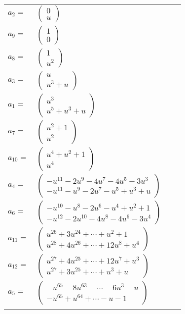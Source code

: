 \documentclass[1p]{elsarticle_modified}
\theoremstyle{definition}
\begin{document}
\begin{tabular}{m{7pt} m{180pt} m{7pt} m{180pt} }
\flushright $a_{2}=$&$\begin{pmatrix}0\\u\end{pmatrix}$ \\
\flushright $a_{9}=$&$\begin{pmatrix}1\\0\end{pmatrix}$ \\
\flushright $a_{8}=$&$\begin{pmatrix}1\\u^2\end{pmatrix}$ \\
\flushright $a_{3}=$&$\begin{pmatrix}u\\u^3+u\end{pmatrix}$ \\
\flushright $a_{1}=$&$\begin{pmatrix}u^3\\u^5+u^3+u\end{pmatrix}$ \\
\flushright $a_{7}=$&$\begin{pmatrix}u^2+1\\u^2\end{pmatrix}$ \\
\flushright $a_{10}=$&$\begin{pmatrix}u^4+u^2+1\\u^4\end{pmatrix}$ \\
\flushright $a_{4}=$&$\begin{pmatrix}- u^{11}-2 u^9-4 u^7-4 u^5-3 u^3\\- u^{11}- u^9-2 u^7- u^5+u^3+u\end{pmatrix}$ \\
\flushright $a_{6}=$&$\begin{pmatrix}- u^{10}- u^8-2 u^6- u^4+u^2+1\\- u^{12}-2 u^{10}-4 u^8-4 u^6-3 u^4\end{pmatrix}$ \\
\flushright $a_{11}=$&$\begin{pmatrix}u^{26}+3 u^{24}+\cdots+u^2+1\\u^{28}+4 u^{26}+\cdots+12 u^8+u^4\end{pmatrix}$ \\
\flushright $a_{12}=$&$\begin{pmatrix}u^{27}+4 u^{25}+\cdots+12 u^7+u^3\\u^{27}+3 u^{25}+\cdots+u^3+u\end{pmatrix}$ \\
\flushright $a_{5}=$&$\begin{pmatrix}- u^{65}-8 u^{63}+\cdots-6 u^3- u\\- u^{65}+u^{64}+\cdots- u-1\end{pmatrix}$\\&\end{tabular}
\end{document}
